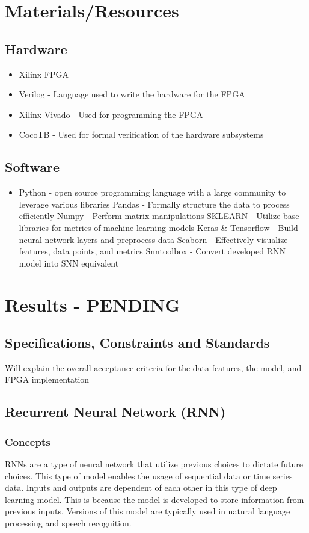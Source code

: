\documentclass[12pt,titlepage]{article}
\begin{document}
\section{Materials/Resources}
\subsection{Hardware}
\begin{itemize}
	\item Xilinx FPGA
	\item Verilog - Language used to write the hardware for the FPGA
	\item Xilinx Vivado - Used for programming the FPGA
	\item CocoTB - Used for formal verification of the hardware subsystems
\end{itemize}	

\subsection{Software}
\begin{itemize}
	\item Python - open source programming language with a large community to leverage various libraries
		\subitem Pandas - Formally structure the data to process efficiently
		\subitem Numpy - Perform matrix manipulations 
		\subitem SKLEARN - Utilize base libraries for metrics of machine learning models
		\subitem Keras \& Tensorflow - Build neural network layers and preprocess data
		\subitem Seaborn - Effectively visualize features, data points, and metrics
		\subitem Snntoolbox - Convert developed RNN model into SNN equivalent
\end{itemize}	

\section{Results - PENDING}
\subsection{Specifications, Constraints and Standards}
Will explain the overall acceptance criteria for the data features, the model, and FPGA implementation

\subsection{Recurrent Neural Network (RNN)}
\subsubsection{Concepts}
RNNs are a type of neural network that utilize previous choices to dictate future choices. This type of model enables the usage of sequential data
or time series data. Inputs and outputs are dependent of each other in this type of deep learning model. This is because the model is developed
to store information from previous inputs. Versions of this model are typically used in natural language processing and speech recognition. 
\end{document}
